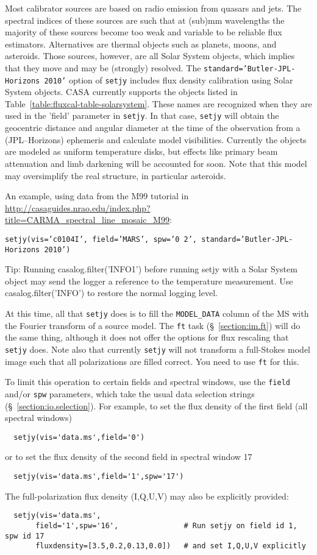 Most calibrator sources are based on radio emission from quasars and
jets. The spectral indices of these sources are such that at (sub)mm
wavelengths the majority of these sources become too weak and variable
to be reliable flux estimators. Alternatives are thermal objects such
as planets, moons, and asteroids. Those sources, however, are all
Solar System objects, which implies that they move and may be
(strongly) resolved. The {\tt standard='Butler-JPL-Horizons 2010'}
option of {\tt setjy} includes flux density calibration using Solar
System objects. CASA currently supports the objects listed in
Table~\ref{table:fluxcal-table-solarsystem}. These names are
recognized when they are used in the 'field'
parameter in {\tt setjy}.  In that case, {\tt setjy} will obtain the
geocentric distance and angular diameter at the time of the
observation from a (JPL--Horizons) ephemeris and calculate model
visibilities.  Currently the objects are modeled as uniform
temperature disks, but effects like primary beam attenuation and limb
darkening will be accounted for soon. Note that this model may
oversimplify the real structure, in particular asteroids.

An example, using data from the M99 tutorial in 
\url{http://casaguides.nrao.edu/index.php?title=CARMA_spectral_line_mosaic_M99}:

{\tt setjy(vis='c0104I', field='MARS', spw='0~2', standard='Butler-JPL-Horizons 2010')}

Tip: Running casalog.filter('INFO1') before running setjy with a Solar
System object may send the logger a reference to the temperature
measurement.  Use casalog.filter('INFO') to restore the normal logging
level.


At this time, all that {\tt setjy} does is to fill
the {\tt MODEL\_DATA} column of the MS with the Fourier transform of
a source model.  The {\tt ft} task (\S~\ref{section:im.ft})
will do the same thing, although it does not offer the options for
flux rescaling that {\tt setjy} does.  Note also that currently 
{\tt setjy} will not transform a full-Stokes model image such that all
polarizations are filled correct.  You need to use {\tt ft} for this.




To limit this operation to certain fields and spectral windows, use
the {\tt field} and/or {\tt spw} parameters, which take the usual
data selection strings (\S~\ref{section:io.selection}). For example, 
to set the flux density of the first field (all spectral windows)
\small
\begin{verbatim}
  setjy(vis='data.ms',field='0')
\end{verbatim}
\normalsize
or to set the flux density of the second field in spectral window 17
\small
\begin{verbatim}
  setjy(vis='data.ms',field='1',spw='17')
\end{verbatim}
\normalsize
The full-polarization flux density (I,Q,U,V) may also be explicitly provided:
\small
\begin{verbatim}
  setjy(vis='data.ms',
       field='1',spw='16',               # Run setjy on field id 1, spw id 17
       fluxdensity=[3.5,0.2,0.13,0.0])   # and set I,Q,U,V explicitly
\end{verbatim}
\normalsize


